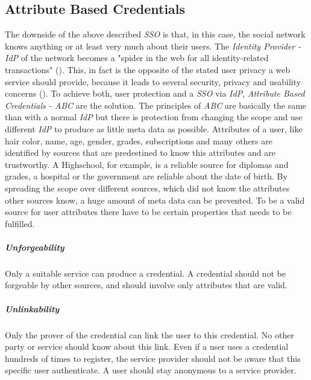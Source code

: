 
\subsection{Attribute Based Credentials}
The downside of the above described \textit{SSO} is that, in this case, the social network knows anything or at least very much about their users. The \textit{Identity Provider - IdP} of the network becomes a "spider in the web for all identity-related transactions" (\cite{danezis2015privacy}). This, in fact is the opposite of the stated user privacy a web service should provide, because it leads to several security, privacy and usability concerns (\cite{alpar2011identity}). To achieve both, user protection and a \textit{SSO} via \textit{IdP}, \textit{Attribute Based Credentials - ABC} are the solution. The principles of \textit{ABC} are basically the same than with a normal \textit{IdP} but there is protection from changing the scope and use different \textit{IdP} to produce as little meta data as possible. Attributes of a user, like hair color, name, age, gender, grades, subscriptions and many others are identified by sources that are predestined to know this attributes and are trustworthy. A Highschool, for example,
 is a reliable source for diplomas and grades, a hospital or the government are reliable about the date of birth. By spreading the scope over different sources, which did not know the attributes other sources know, a huge amount of meta data can be prevented. To be a valid source for user attributes there have to be certain properties that needs to be fulfilled. 

\subparagraph{Unforgeability}
\label{subp:subparagraph_name}
Only a suitable service can produce a credential. A credential should not be forgeable by other sources, and should involve only attributes that are valid.

\subparagraph{Unlinkability}
\label{subp:unlinkability}
Only the prover of the credential can link the user to this credential. No other party or service should know about this link. Even if a user uses a credential hundreds of times to register, the service provider should not be aware that this specific user authenticate. A user should stay anonymous to a service provider.

